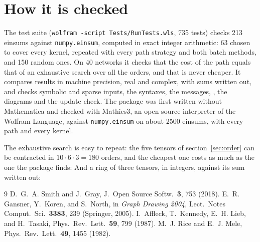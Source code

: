 \documentclass[11pt,a4paper]{article}
\begin{document}
\section{How it is checked}
The test suite (\texttt{wolfram -script Tests/RunTests.wls}, 735 tests) checks 213 einsums against \texttt{numpy.einsum},
computed in exact integer arithmetic: 63 chosen to cover every kernel, repeated with every path strategy and both batch
methods, and 150 random ones. On 40 networks it checks that the cost of the  path equals that of an exhaustive
search over all the orders, and that  is never cheaper. It compares results in machine precision, real and
complex, with sums written out, and checks symbolic and sparse inputs, the syntaxes, the messages, ,
the diagrams and the update check. The package was first written without Mathematica and checked with Mathics3, an
open-source interpreter of the Wolfram Language, against \texttt{numpy.einsum} on about 2500 einsums, with every path and
every kernel.

The exhaustive search is easy to repeat: the five tensors of section~\ref{sec:order} can be contracted in
$10\cdot6\cdot3=180$ orders, and the cheapest one costs as much as the one the package finds:
And a ring of three tensors, in integers, against its sum written out:

\begin{thebibliography}{9}\small
{} D.~G.~A. Smith and J.~Gray, J.\ Open Source Softw.\ {\bf 3}, 753 (2018).
 E.~R. Gansner, Y.~Koren, and S.~North, in \emph{Graph Drawing 2004}, Lect.\ Notes Comput.\ Sci.\ {\bf 3383},
239 (Springer, 2005).
 I.~Affleck, T.~Kennedy, E.~H. Lieb, and H.~Tasaki, Phys.\ Rev.\ Lett.\ {\bf 59}, 799 (1987).
 M.~J. Rice and E.~J. Mele, Phys.\ Rev.\ Lett.\ {\bf 49}, 1455 (1982).
\end{thebibliography}
\end{document}
